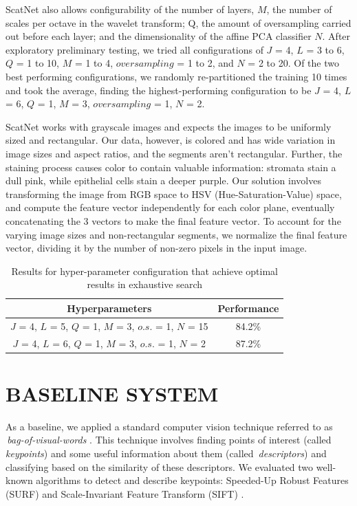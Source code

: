 \documentclass{article}
\begin{document}
ScatNet also allows configurability of the number of layers, $M$, the number of scales
per octave in the wavelet transform; Q, the amount of oversampling carried out before
each layer; and the dimensionality of the affine PCA classifier $N$. After exploratory
preliminary testing, we tried all configurations of $J$ = 4, $L$ = 3 to 6, $Q$ = 1 to
10, $M$ = 1 to 4, $oversampling$ = 1 to 2, and $N$ = 2 to 20. Of the two best performing
configurations, we randomly re-partitioned the training 10 times and took the average,
finding the highest-performing configuration to be $J$ = 4, $L$ = 6, $Q$ = 1, $M$ = 3,
$oversampling$ = 1, $N$ = 2. 

ScatNet works with grayscale images and expects the images to be uniformly sized
and rectangular. Our data, however, is colored and has wide variation in image sizes
and aspect ratios, and the segments aren't rectangular. Further, the staining process
causes color to contain valuable information:  stromata stain a dull pink, while
epithelial cells stain a deeper purple. Our solution involves transforming the image
from RGB space to HSV (Hue-Saturation-Value) space, and compute the feature vector
independently for each color plane, eventually concatenating the 3 vectors to make 
the final feature vector. To account for the varying image sizes and non-rectangular
segments, we normalize the final feature vector, dividing it by the number of non-zero
pixels in the input image.

\begin{table}
	\begin{tabular}{c | c}
		\multicolumn{1}{c}{Hyperparameters} & Performance \\ \hline
		$J$ = 4, $L$ = 5, $Q$ = 1, $M$ = 3, $o.s.$ = 1, $N$ = 15 & 84.2\% \\
		$J$ = 4, $L$ = 6, $Q$ = 1, $M$ = 3, $o.s.$ = 1, $N$ = 2 & 87.2\% \\
	\end{tabular}
	\caption{Results for hyper-parameter configuration that achieve optimal results
	in exhaustive search}
\end{table}


\section{BASELINE SYSTEM}
\label{sec:baseline}

As a baseline, we applied a standard computer vision technique referred to as
 \emph{bag-of-visual-words} \cite{Csurka2004} \cite{Yang2007}. This technique 
involves finding points of interest (called  \emph{keypoints}) and some useful
information about them (called  \emph{descriptors}) and classifying based on the
similarity of these descriptors. We evaluated two well-known algorithms to
detect and describe keypoints: Speeded-Up Robust Features (SURF) \cite{Bay2008}
and Scale-Invariant Feature Transform (SIFT) \cite{Lowe1999}.
\end{document}
